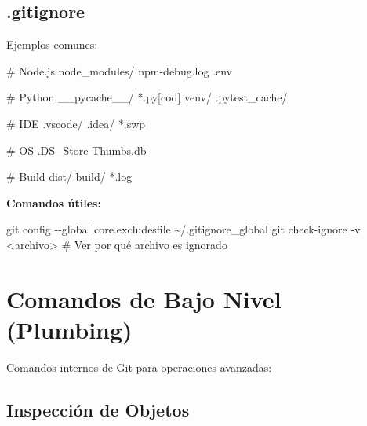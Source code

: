 \documentclass[
  doc,
  floatsintext,
  longtable,
  a4paper,
  nolmodern,
  notxfonts,
  notimes,
  12pt,
  colorlinks=true,linkcolor=blue,citecolor=blue,urlcolor=blue]{apa7}
\newenvironment{Shaded}{\begin{snugshade}}{\end{snugshade}}
\newcommand{\AttributeTok}[1]{\textcolor[rgb]{0.40,0.45,0.13}{#1}}
\newcommand{\CommentTok}[1]{\textcolor[rgb]{0.37,0.37,0.37}{#1}}
\newcommand{\FunctionTok}[1]{\textcolor[rgb]{0.28,0.35,0.67}{#1}}
\newcommand{\NormalTok}[1]{\textcolor[rgb]{0.00,0.23,0.31}{#1}}
\newcommand{\OperatorTok}[1]{\textcolor[rgb]{0.37,0.37,0.37}{#1}}
\begin{document}
\subsection{.gitignore}\label{gitignore}

Ejemplos comunes:

\begin{Shaded}
\begin{Highlighting}[]
\NormalTok{\# Node.js}
\NormalTok{node\_modules/}
\NormalTok{npm{-}debug.log}
\NormalTok{.env}

\NormalTok{\# Python}
\NormalTok{\_\_pycache\_\_/}
\NormalTok{*.py[cod]}
\NormalTok{venv/}
\NormalTok{.pytest\_cache/}

\NormalTok{\# IDE}
\NormalTok{.vscode/}
\NormalTok{.idea/}
\NormalTok{*.swp}

\NormalTok{\# OS}
\NormalTok{.DS\_Store}
\NormalTok{Thumbs.db}

\NormalTok{\# Build}
\NormalTok{dist/}
\NormalTok{build/}
\NormalTok{*.log}
\end{Highlighting}
\end{Shaded}

\textbf{Comandos útiles:}

\begin{Shaded}
\begin{Highlighting}[]
\FunctionTok{git}\NormalTok{ config }\AttributeTok{{-}{-}global}\NormalTok{ core.excludesfile \textasciitilde{}/.gitignore\_global}
\FunctionTok{git}\NormalTok{ check{-}ignore }\AttributeTok{{-}v} \OperatorTok{\textless{}}\NormalTok{archivo}\OperatorTok{\textgreater{}}  \CommentTok{\# Ver por qué archivo es ignorado}
\end{Highlighting}
\end{Shaded}

\section{Comandos de Bajo Nivel
(Plumbing)}\label{comandos-de-bajo-nivel-plumbing}

Comandos internos de Git para operaciones avanzadas:

\subsection{Inspección de Objetos}\label{inspecciuxf3n-de-objetos}
\end{document}
